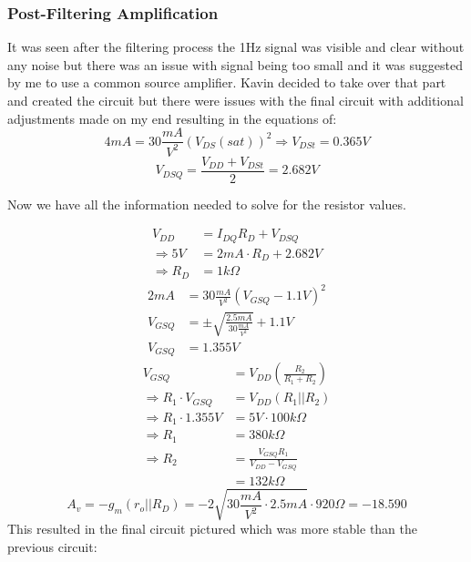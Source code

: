 \documentclass{article}
\begin{document}
\subsubsection{Post-Filtering Amplification}
It was seen after the filtering process the 1Hz signal was visible and clear without any noise but there was an issue with signal being too small and it was suggested by me to use a common source amplifier. Kavin decided to take over that part and created the circuit but there were issues with the final circuit with additional adjustments made on my end resulting in the equations of:
\begin{equation}
    4mA = 30\frac{mA}{V^2}(V_{DS}(sat))^2 \Rightarrow V_{DSt} = 0.365V
\end{equation}
\begin{equation}
    V_{DSQ} = \frac{V_{DD}+V_{DSt}}{2}= 2.682V
\end{equation}
\begin{center}
    Now we have all the information needed to solve for the resistor values.
\end{center}
\begin{align}
    V_{DD} &=  I_{DQ}R_D + V_{DSQ}\\
    \Rightarrow 5V &=  2mA\cdot R_D + 2.682V\\
    \Rightarrow R_D &=  \boxed{1k\Omega}
\end{align}
\begin{align}
    2mA &= 30\frac{mA}{V^2}(V_{GSQ}-1.1V)^2\\
     V_{GSQ} &= \pm\sqrt{\frac{2.5mA}{30\frac{mA}{V^2}}} + 1.1V\\
     V_{GSQ} &= 1.355V
\end{align}
\begin{align}
    V_{GSQ} &= V_{DD}\left(\frac{R_2}{R_1+R_2}\right)\\
    \Rightarrow R_1\cdot V_{GSQ} &= V_{DD}(R_1||R_2)\\
    \Rightarrow R_1\cdot1.355V &= 5V\cdot100k\Omega\\
    \Rightarrow R_1 &= \boxed{380k\Omega}\\
    \Rightarrow R_2 &= \frac{V_{GSQ}R_1}{V_{DD}-V_{GSQ}}\\
    &= \boxed{132k\Omega}
\end{align}
\begin{equation}
        A_v = -g_m(r_o||R_D) = -2\sqrt{30\frac{mA}{V^2}\cdot 2.5mA} \cdot 920\Omega = \boxed{-18.590}
\end{equation}
\newpage
This resulted in the final circuit pictured which was more stable than the previous circuit:
\end{document}
